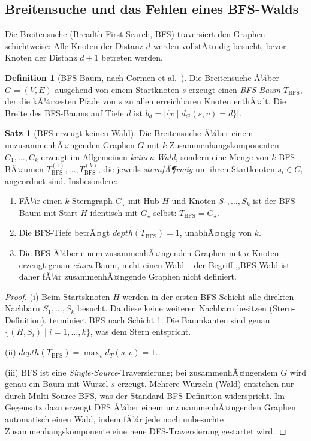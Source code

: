 ﻿\documentclass[a4paper,12pt]{report}
\theoremstyle{definition}
\newtheorem{definition}{Definition}[chapter]
\newtheorem{theorem}{Satz}[chapter]
\theoremstyle{remark}
\newcommand{\depth}{\mathit{depth}}
\begin{document}
\subsection{Breitensuche und das Fehlen eines BFS-Walds}

Die Breitensuche (Breadth-First Search, BFS) traversiert den Graphen
schichtweise: Alle Knoten der Distanz $d$ werden vollstÃ¤ndig besucht, bevor
Knoten der Distanz $d+1$ betreten werden.

\begin{definition}[BFS-Baum, nach Cormen et al.~\cite{Cormen2009}]
\label{def:bfsbaum}
Die Breitensuche Ã¼ber $G = (V, E)$ ausgehend von einem Startknoten $s$
erzeugt einen \emph{BFS-Baum} $T_{\mathrm{BFS}}$, der die kÃ¼rzesten Pfade
von $s$ zu allen erreichbaren Knoten enthÃ¤lt. Die Breite des BFS-Baums auf
Tiefe $d$ ist $b_d = |\{v \mid d_G(s,v) = d\}|$.
\end{definition}

\begin{theorem}[BFS erzeugt keinen Wald]
\label{thm:bfskeinwald}
Die Breitensuche Ã¼ber einem unzusammenhÃ¤ngenden Graphen $G$ mit $k$
Zusammenhangskomponenten $C_1, \ldots, C_k$ erzeugt im Allgemeinen
\emph{keinen Wald}, sondern eine Menge von $k$ BFS-BÃ¤umen
$T_{\mathrm{BFS}}^{(1)}, \ldots, T_{\mathrm{BFS}}^{(k)}$, die jeweils
\emph{sternfÃ¶rmig} um ihren Startknoten $s_i \in C_i$ angeordnet sind.
Insbesondere:
\begin{enumerate}[label=(\roman*)]
  \item FÃ¼r einen $k$-Stern\-graph $G_\star$ mit Hub $H$ und Knoten
        $S_1, \ldots, S_k$ ist der BFS-Baum mit Start $H$ identisch
        mit $G_\star$ selbst: $T_{\mathrm{BFS}} = G_\star$.
  \item Die BFS-Tiefe betrÃ¤gt $\depth(T_{\mathrm{BFS}}) = 1$, unabhÃ¤ngig
        von $k$.
  \item Die BFS Ã¼ber einem zusammenhÃ¤ngenden Graphen mit $n$ Knoten
        erzeugt genau \emph{einen} Baum, nicht einen Wald -- der Begriff
        ,,BFS-Wald\grqq{} ist daher fÃ¼r zusammenhÃ¤ngende Graphen
        nicht definiert.
\end{enumerate}
\end{theorem}

\begin{proof}
(i) Beim Startsknoten $H$ werden in der ersten BFS-Schicht alle direkten
Nachbarn $S_1, \ldots, S_k$ besucht. Da diese keine weiteren Nachbarn
besitzen (Stern-Definition), terminiert BFS nach Schicht 1.
Die Baumkanten sind genau $\{(H, S_i) \mid i = 1, \ldots, k\}$, was dem
Stern entspricht.

(ii) $\depth(T_{\mathrm{BFS}}) = \max_{v} d_{T}(s, v) = 1$.

(iii) BFS ist eine \emph{Single-Source}-Traversierung; bei zusammenhÃ¤ngendem
$G$ wird genau ein Baum mit Wurzel $s$ erzeugt. Mehrere Wurzeln (Wald)
entstehen nur durch Multi-Source-BFS, was der Standard-BFS-Definition
widerspricht. Im Gegensatz dazu erzeugt DFS Ã¼ber einem unzusammenhÃ¤ngenden
Graphen automatisch einen Wald, indem fÃ¼r jede noch unbesuchte Zusammenhangskomponente
eine neue DFS-Traversierung gestartet wird.
\end{proof}
\end{document}
